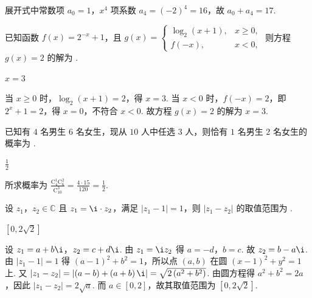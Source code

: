 \begin{solution}
展开式中常数项 \(a_0=1\)，\(x^4\) 项系数 \(a_4=\left(-2\right)^4=16\)，故 \(a_0+a_4=17\).
\end{solution}

\begin{problem}
已知函数 \(f(x)=2^{-x}+1\)，且 \(g(x)= \begin{cases}
\log_2(x+1),  &x\ge 0,\\
f(-x),  &x<0,
\end{cases}\)
则方程 \(g(x)=2\) 的解为\fillinblank{} .
\end{problem}

\begin{answer}
\(x=3\)
\end{answer}

\begin{solution}
当 \(x\ge 0\) 时，\(\log_2(x+1)=2\)，得 \(x=3\). 当 \(x<0\) 时，\(f(-x)=2\)，即 \(2^x+1=2\)，得 \(x=0\)，不符合 \(x<0\). 故方程 \(g(x)=2\) 的解为 \(x=3\).
\end{solution}

\begin{problem}
已知有 \(4\) 名男生 \(6\) 名女生，现从 \(10\) 人中任选 \(3\) 人，则恰有 \(1\) 名男生 \(2\) 名女生的概率为\fillinblank{} .
\end{problem}

\begin{answer}
\(\frac{1}{2}\)
\end{answer}

\begin{solution}
所求概率为 \(\frac{\mathrm C_4^1\mathrm C_6^2}{\mathrm C_{10}^3}=\frac{4\cdot 15}{120}=\frac12\).
\end{solution}

\begin{problem}
设 \(z_1\)，\(z_2\in \mathbb{C}\) 且 \(z_1=\i\cdot z_2\)，满足 \(\left|z_1-1\right|=1\)，则 \(\left|z_1-z_2\right|\) 的取值范围为\fillinblank{} .
\end{problem}

\begin{answer}
\(\left[0,2\sqrt2\right]\)
\end{answer}

\begin{solution}
设 \(z_1=a+b\i\)，\(z_2=c+d\i\). 由 \(z_1=\i z_2\) 得 \(a=-d\)，\(b=c\). 故 \(z_2=b-a\i\). 由 \(\left|z_1-1\right|=1\) 得 \(\left(a-1\right)^2+b^2=1\)，所以点 \(\left(a,b\right)\) 在圆 \(\left(x-1\right)^2+y^2=1\) 上. 又 \(\left|z_1-z_2\right|=\left|\left(a-b\right)+\left(a+b\right)\i\right|=\sqrt{2\left(a^2+b^2\right)}\). 由圆方程得 \(a^2+b^2=2a\)，因此 \(\left|z_1-z_2\right|=2\sqrt a\).
而 \(a\in[0,2]\)，故其取值范围为 \(\left[0,2\sqrt2\right]\).
\end{solution}

